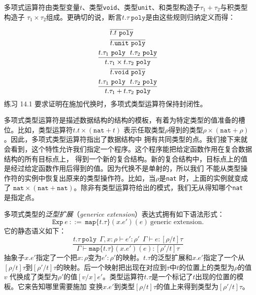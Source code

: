 多项式运算符由类型变量$t$、类型\texttt{void}、类型\texttt{unit}、和类型构造子$\tau_1 + \tau_2$与积类型构造子
$\tau_1\times\tau_2$组成。更确切的说，断言$t.\tau\ \texttt{poly}$是由这些规则归纳定义而得：

\begin{subequations}
	\begin{gather}
	\overline{t.t\ \texttt{poly}} \newline\\
	\overline{t.\texttt{unit}\ \texttt{poly}} \\
	\frac{t.\tau_1\ \texttt{poly}\ \ t.\tau_2\ \texttt{poly}}{t.\tau_1\times t.\tau_2\ \texttt{poly}} \\
	\overline{t.\texttt{void}\ \texttt{poly}} \\
	\frac{t.\tau_1\ \texttt{poly}\ \ t.\tau_2\ \texttt{poly}}{t.\tau_1 + t.\tau_2\ \texttt{poly}}
	\end{gather}
\end{subequations}
练习 14.1 要求证明在施加代换时，多项式类型运算符保持封闭性。

多项式类型运算符是描述数据结构的结构的模板，有着为特定类型的值准备的槽位。比如，类型运算符$t.t\times(\texttt{nat} + t)$
表示任取类型$\rho$得到的类型$\rho\times(\texttt{nat} + \rho)$。因此，多项式类型运算符指出了数据结构中
拥有共同类型的点。我们接下来就会看到，这个特性允许我们指定一个程序。这个程序能把给定函数作用在复合数据结构的所有目标点上，
得到一个新的复合结构。新的复合结构中，目标点上的值是经过给定函数作用后得到的值。因为代换不是单射的，所以我们
不能从类型操作符的实例中恢复出原来的类型操作符。比如，当$\rho$是\texttt{nat} 时，上面的实例就变成了
$\texttt{nat}\times(\texttt{nat} +\texttt{nat})$。除非有类型运算符给出的模式，我们无从得知哪个\texttt{nat} 是指定点。

多项式类型的\textit{泛型扩展}（\textit{generice extension}）表达式拥有如下语法形式：
$$\texttt{Exp}\ e\ ::=\ \texttt{map}\{t.\tau\}(x.e')(e)\ \text{generic extension.}$$
它的静态语义如下：
\begin{equation} \label{eq:generic-extension-statics}
\frac{t.\tau\ \texttt{poly}\ \ \Gamma,x:\rho\vdash e':\rho'\ \ \Gamma\vdash e:[\rho/t]\tau}
{\Gamma\vdash \texttt{map}\{t.\tau\}(x.e')(e):[\rho'/t]\tau}
\end{equation}
抽象子$x.e'$指定了一个把$x:\rho$变为$e':\rho'$的映射。$t.\tau$的泛型扩展和$x.e'$指定了一个从
$[\rho/t]\tau$到$[\rho'/t]\tau$的映射。后一个映射把出现在对应到$\tau$中$t$的位置上的类型为$\rho$的值$v$
代换成了类型为$\rho'$的值$[v/x]e'$。类型运算符$t.\tau$是一个标记了$t$出现的位置的模板。它来告知哪里需要施加
变换$x.e'$到类型$[\rho/t]\tau$的值上来得到类型为$[\rho'/t]\tau$。


